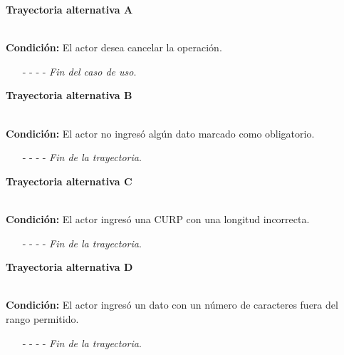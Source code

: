 \hypertarget{CU3-1:TAA}{\textbf{Trayectoria alternativa A}}\\
\noindent \textbf{Condición:} El actor desea cancelar la operación.
\begin{enumerate}
	\UCpaso[\UCactor] Solicita cancelar la operación oprimiendo el botón  de la pantalla .
	\UCpaso[\UCsist] Muestra la pantalla 
	\item[- -] - - {\em {Fin del caso de uso}}.%
\end{enumerate}
\hypertarget{CU3-1:TAB}{\textbf{Trayectoria alternativa B}}\\
\noindent \textbf{Condición:} El actor no ingresó algún dato marcado como obligatorio.
\begin{enumerate}
	\UCpaso[\UCsist] Muestra el mensaje  señalando el campo que presenta el error en la pantalla .
	\UCpaso Regresa al paso \ref{CU3.1-P3} de la trayectoria principal.
	\item[- -] - - {\em {Fin de la trayectoria}}.%
\end{enumerate}
\hypertarget{CU3-1:TAC}{\textbf{Trayectoria alternativa C}}\\
\noindent \textbf{Condición:} El actor ingresó una CURP con una longitud incorrecta.
\begin{enumerate}
	\UCpaso[\UCsist] Muestra el mensaje  y señala el campo que presenta el error en la pantalla .
	\UCpaso Regresa al paso \ref{CU3.1-P3} de la trayectoria principal.
	\item[- -] - - {\em {Fin de la trayectoria}}.%
\end{enumerate}
\hypertarget{CU3-1:TAD}{\textbf{Trayectoria alternativa D}}\\
\noindent \textbf{Condición:} El actor ingresó un dato con un número de caracteres fuera del rango permitido.
\begin{enumerate}
	\UCpaso[\UCsist] Muestra el mensaje  señalando el campo que presenta el error en la pantalla .
	\UCpaso Regresa al paso \ref{CU3.1-P3} de la trayectoria principal.
	\item[- -] - - {\em {Fin de la trayectoria}}.%
\end{enumerate}
